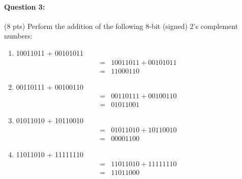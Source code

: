 \documentclass[12pt,letterpaper,titlepage]{report}
\begin{document}
\begin{raggedright}
\paragraph{Question 3:}
(8 pts) Perform the addition of the following 8‐bit (signed) 2’s complement numbers: 
\begin{multicols}{2}
\begin{enumerate} [label=\alph*)]
\item 10011011 + 00101011
\begin{align*}
  =& 10011011 + 00101011
\\=& 11000110
\end{align*}
\item 00110111 + 00100110
\begin{align*}
  =& 00110111 + 00100110
\\=& 01011001
\end{align*}
\item 01011010 + 10110010
\begin{align*}
  =& 01011010 + 10110010
\\=& 00001100
\end{align*}
\item 11011010 + 11111110 
\begin{align*}
  =& 11011010 + 11111110
\\=& 11011000
\end{align*}
\end{enumerate}
\end{multicols}


\end{raggedright}
\end{document}
